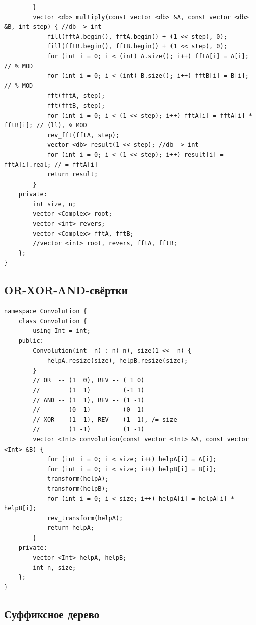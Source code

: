 \documentclass[10pt, portrait,letterpaper]{article}
\begin{document}
\begin{verbatim}
        }
        vector <db> multiply(const vector <db> &A, const vector <db> &B, int step) { //db -> int
            fill(fftA.begin(), fftA.begin() + (1 << step), 0);
            fill(fftB.begin(), fftB.begin() + (1 << step), 0);
            for (int i = 0; i < (int) A.size(); i++) fftA[i] = A[i]; // % MOD
            for (int i = 0; i < (int) B.size(); i++) fftB[i] = B[i]; // % MOD
            fft(fftA, step);
            fft(fftB, step);
            for (int i = 0; i < (1 << step); i++) fftA[i] = fftA[i] * fftB[i]; // (ll), % MOD
            rev_fft(fftA, step);
            vector <db> result(1 << step); //db -> int
            for (int i = 0; i < (1 << step); i++) result[i] = fftA[i].real; // = fftA[i]
            return result;
        }
    private:
        int size, n;
        vector <Complex> root;
        vector <int> revers;
        vector <Complex> fftA, fftB;
        //vector <int> root, revers, fftA, fftB;
    };
}
\end{verbatim}

\subsection{OR-XOR-AND-свёртки}

\begin{verbatim}
namespace Convolution {
    class Convolution {
        using Int = int;
    public:
        Convolution(int _n) : n(_n), size(1 << _n) {
            helpA.resize(size), helpB.resize(size);
        }
        // OR  -- (1  0), REV -- ( 1 0)
        //        (1  1)         (-1 1)
        // AND -- (1  1), REV -- (1 -1)
        //        (0  1)         (0  1)
        // XOR -- (1  1), REV -- (1  1), /= size
        //        (1 -1)         (1 -1)
        vector <Int> convolution(const vector <Int> &A, const vector <Int> &B) {
            for (int i = 0; i < size; i++) helpA[i] = A[i];
            for (int i = 0; i < size; i++) helpB[i] = B[i];
            transform(helpA);
            transform(helpB);
            for (int i = 0; i < size; i++) helpA[i] = helpA[i] * helpB[i];
            rev_transform(helpA);
            return helpA;
        }
    private:
        vector <Int> helpA, helpB;
        int n, size;
    };
}
\end{verbatim}

\subsection{Суффиксное дерево}
\end{document}
